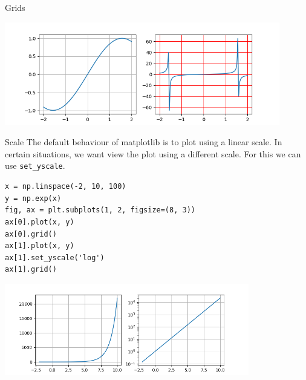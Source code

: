 \documentclass[10pt]{beamer}
\begin{document}
\begin{frame}[label={sec:org68e39ca}]{Grids}
\begin{center}
\includegraphics[width=0.9\textwidth]{images/grids.png}
\end{center}
\end{frame}

\begin{frame}[label={sec:orga3bf2d5},fragile]{Scale}
 The default behaviour of matplotlib is to plot using a linear scale. In certain
situations, we want view the plot using a different scale. For this we can use \texttt{set\_yscale}.

\begin{verbatim}
x = np.linspace(-2, 10, 100)
y = np.exp(x)
fig, ax = plt.subplots(1, 2, figsize=(8, 3))
ax[0].plot(x, y)
ax[0].grid()
ax[1].plot(x, y)
ax[1].set_yscale('log')
ax[1].grid()
\end{verbatim}

\begin{center}
\includegraphics[width=0.8\textwidth]{images/scale.png}
\end{center}
\end{frame}
\end{document}
